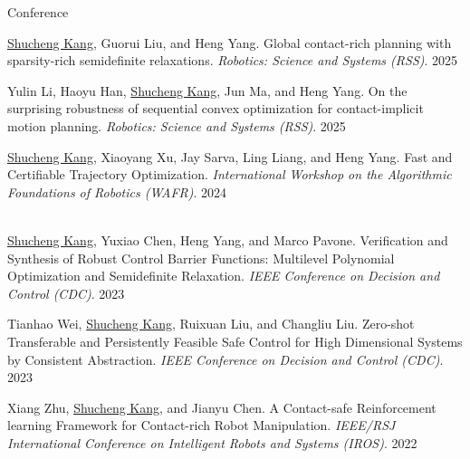 Conference\\
\begin{enumerate}[{label=[C\arabic*]}]
    \item \underline{Shucheng Kang}, Guorui Liu, and Heng Yang. Global contact-rich planning with sparsity-rich semidefinite relaxations. \emph{Robotics: Science and Systems (RSS)}. 2025   
    
    \item Yulin Li, Haoyu Han, \underline{Shucheng Kang}, Jun Ma, and Heng Yang. On the surprising robustness of sequential convex optimization for contact-implicit motion planning. \emph{Robotics: Science and Systems (RSS)}. 2025   

    \item \underline{Shucheng Kang}, Xiaoyang Xu, Jay Sarva, Ling Liang, and Heng Yang. Fast and Certifiable Trajectory Optimization. \emph{International Workshop on the Algorithmic Foundations of Robotics (WAFR)}. 2024     \\
     \\
    
    \item \underline{Shucheng Kang}, Yuxiao Chen, Heng Yang, and Marco Pavone. Verification and Synthesis of Robust Control Barrier Functions: Multilevel Polynomial Optimization and Semidefinite Relaxation. \emph{IEEE Conference on Decision and Control (CDC)}. 2023 
 
    \item Tianhao Wei, \underline{Shucheng Kang}, Ruixuan Liu, and Changliu Liu. Zero-shot Transferable and Persistently Feasible Safe Control for High Dimensional Systems by Consistent Abstraction. \emph{IEEE Conference on Decision and Control (CDC)}. 2023 
    
    \item Xiang Zhu, \underline{Shucheng Kang}, and Jianyu Chen. A Contact-safe Reinforcement learning Framework for Contact-rich Robot Manipulation. \emph{IEEE/RSJ International Conference on Intelligent Robots and Systems (IROS)}. 2022 
\end{enumerate}

